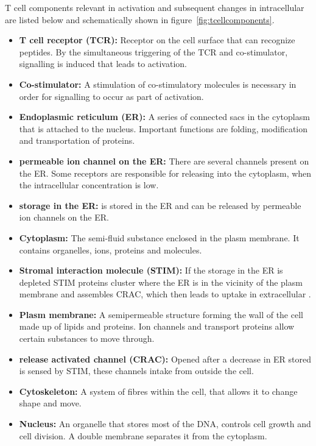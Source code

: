 T cell components relevant in activation and subsequent changes in intracellular \Calcium are listed below and schematically shown in figure~\ref{fig:tcellcomponents}.

\begin{itemize}
	\item \textbf{T cell receptor (TCR):} Receptor on the cell surface that can recognize peptides. By the simultaneous triggering of the TCR and co-stimulator, signalling is induced that leads to activation.
	\item \textbf{Co-stimulator:} A stimulation of co-stimulatory molecules is necessary in order for signalling to occur as part of activation.
	\item \textbf{Endoplasmic reticulum (ER):} A series of connected sacs in the cytoplasm that is attached to the nucleus. Important functions are folding, modification and transportation of proteins.\cite{Rogers2024}
	\item \textbf{\Calcium permeable ion channel on the ER:} There are several \Calcium channels present on the ER. Some receptors are responsible for releasing \Calcium into the cytoplasm, when the intracellular \Calcium concentration is low. \cite{Schwarz2016}
	\item \textbf{\Calcium storage in the ER:} \Calcium is stored in the ER and can be released by \Calcium permeable ion channels on the ER.
	\item \textbf{Cytoplasm:} The semi-fluid substance enclosed in the plasm membrane. It contains organelles, ions, proteins and molecules.
	\item \textbf{Stromal interaction molecule (STIM):} If the \Calcium storage in the ER is depleted STIM proteins cluster where the ER is in the vicinity of the plasm membrane and assembles CRAC, which then leads to uptake in extracellular \Calcium. \cite{Schwarz2016}
	\item \textbf{Plasm membrane:} A semipermeable structure forming the wall of the cell made up of lipids and proteins. Ion channels and transport proteins allow certain substances to move through.\cite{Ganong2012}
	\item \textbf{\Calcium release activated \Calcium channel (CRAC):} Opened after a decrease in ER stored \Calcium is sensed by STIM, these channels intake \Calcium from outside the cell.\cite{Stathopulos2013}
	\item \textbf{Cytoskeleton:} A system of fibres within the cell, that allows it to change shape and move.\cite{Ganong2012}
	\item \textbf{Nucleus:} An organelle that stores most of the DNA, controls cell growth and cell division. A double membrane separates it from the cytoplasm.\cite{cooper2022}
\end{itemize}


